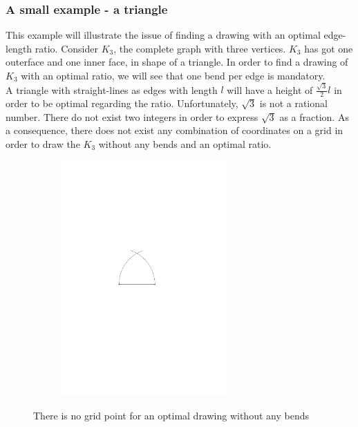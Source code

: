 \subsubsection{A small example - a triangle}
This example will illustrate the issue of finding a drawing with an optimal edge-length ratio. Consider $K_3$, the complete graph with three vertices. $K_3$ has got one outerface and one inner face, in shape of a triangle. In order to find a drawing of $K_3$ with an optimal ratio, we will see that one bend per edge is mandatory.\\
A triangle with straight-lines as edges with length $l$ will have a height of $\frac{\sqrt{3}}{2}l$ in order to be optimal regarding the ratio. Unfortunately, $\sqrt{3}$ is not a rational number. There do not exist two integers in order to express $\sqrt{3}$ as a fraction. As a consequence, there does not exist any combination of coordinates on a grid in order to draw the $K_3$ without any bends and an optimal ratio.
	\begin{figure}[H]
	\centering
	\begin{subfigure}{0.6\linewidth}
		\centering
		\includegraphics[width=0.7\textwidth,page=1]{drawings/small_example.pdf}
	\end{subfigure}
	\caption{There is no grid point for an optimal drawing without any bends}
\end{figure}

